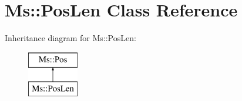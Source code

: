 \hypertarget{class_ms_1_1_pos_len}{}\section{Ms\+:\+:Pos\+Len Class Reference}
\label{class_ms_1_1_pos_len}
Inheritance diagram for Ms\+:\+:Pos\+Len\+:\begin{figure}[H]
\begin{center}
\leavevmode
\includegraphics[height=2.000000cm]{class_ms_1_1_pos_len}
\end{center}
\end{figure}
